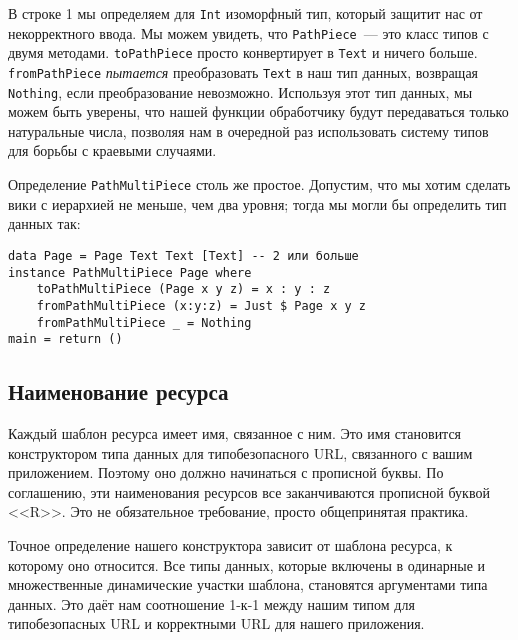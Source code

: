В строке 1 мы определяем для \lstinline!Int! изоморфный тип, который
защитит нас от некорректного ввода. Мы можем увидеть, что
\lstinline!PathPiece!~--- это класс типов с двумя
методами. \lstinline!toPathPiece! просто конвертирует в
\lstinline!Text! и ничего больше. \lstinline!fromPathPiece!
\emph{пытается} преобразовать \lstinline!Text! в наш тип данных,
возвращая \lstinline!Nothing!, если преобразование
невозможно. Используя этот тип данных, мы можем быть уверены, что
нашей функции обработчику будут передаваться только натуральные числа,
позволяя нам в очередной раз использовать систему типов для борьбы с
краевыми случаями.


Определение \lstinline!PathMultiPiece! столь же простое. Допустим,
что мы хотим сделать вики с иерархией не меньше, чем два уровня;
тогда мы могли бы определить тип данных так:
\begin{lstlisting}
data Page = Page Text Text [Text] -- 2 или больше
instance PathMultiPiece Page where
    toPathMultiPiece (Page x y z) = x : y : z
    fromPathMultiPiece (x:y:z) = Just $ Page x y z
    fromPathMultiPiece _ = Nothing
main = return ()
\end{lstlisting}%

\subsection{Наименование ресурса}
Каждый шаблон ресурса имеет имя, связанное с ним. Это имя становится
конструктором типа данных для типобезопасного URL, связанного с вашим
приложением. Поэтому оно должно начинаться с прописной буквы. По
соглашению, эти наименования ресурсов все заканчиваются прописной
буквой <<R>>. Это не обязательное требование, просто общепринятая
практика.

Точное определение нашего конструктора зависит от шаблона ресурса, к
которому оно относится. Все типы данных, которые включены в одинарные
и множественные динамические участки шаблона, становятся аргументами
типа данных. Это даёт нам соотношение 1-к-1 между нашим типом для
типобезопасных URL и корректными URL для нашего приложения.

